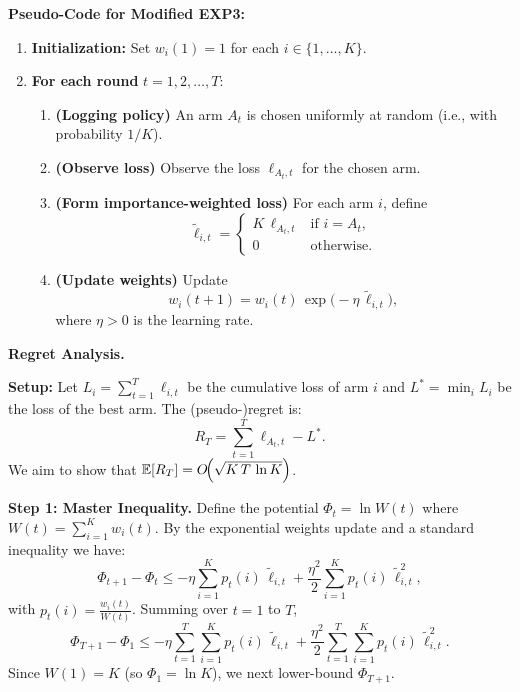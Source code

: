 \medskip
\noindent
\textbf{Pseudo-Code for Modified EXP3:}
\begin{enumerate}
    \item \textbf{Initialization:} Set \(w_i(1)=1\) for each \(i\in\{1,\dots,K\}\).
    \item \textbf{For each round} \(t=1,2,\dots,T\):
    \begin{enumerate}
       \item \textbf{(Logging policy)} An arm \(A_t\) is chosen uniformly at random (i.e., with probability \(1/K\)).
       \item \textbf{(Observe loss)} Observe the loss \(\ell_{A_t,t}\) for the chosen arm.
       \item \textbf{(Form importance-weighted loss)} For each arm \(i\), define
       \[
         \tilde{\ell}_{i,t}=
         \begin{cases}
           K\,\ell_{A_t,t} & \text{if } i=A_t,\\[1mm]
           0 & \text{otherwise.}
         \end{cases}
       \]
       \item \textbf{(Update weights)} Update
       \[
         w_i(t+1)=w_i(t)\,\exp\bigl(-\eta\,\tilde{\ell}_{i,t}\bigr),
       \]
       where \(\eta>0\) is the learning rate.
    \end{enumerate}
\end{enumerate}

\medskip
\noindent
\textbf{Regret Analysis.}

\medskip
\noindent
\textbf{Setup:}  
Let \(L_i=\sum_{t=1}^T \ell_{i,t}\) be the cumulative loss of arm \(i\) and \(L^*=\min_i L_i\) be the loss of the best arm.  
The (pseudo-)regret is:
\[
   R_T=\sum_{t=1}^T \ell_{A_t,t} - L^*.
\]
We aim to show that \(\mathbb{E}[R_T]=O\!\Bigl(\sqrt{K\,T\,\ln K}\Bigr)\).

\medskip
\noindent
\textbf{Step 1: Master Inequality.}  
Define the potential \(\Phi_t=\ln W(t)\) where \(W(t)=\sum_{i=1}^K w_i(t)\).  
By the exponential weights update and a standard inequality we have:
\[
   \Phi_{t+1}-\Phi_t\le -\eta\sum_{i=1}^K p_t(i)\,\tilde{\ell}_{i,t} + \frac{\eta^2}{2}\sum_{i=1}^K p_t(i)\,\tilde{\ell}_{i,t}^2,
\]
with \(p_t(i)=\frac{w_i(t)}{W(t)}\). Summing over \(t=1\) to \(T\),
\[
   \Phi_{T+1}-\Phi_1\le -\eta\sum_{t=1}^T\sum_{i=1}^K p_t(i)\,\tilde{\ell}_{i,t} + \frac{\eta^2}{2}\sum_{t=1}^T\sum_{i=1}^K p_t(i)\,\tilde{\ell}_{i,t}^2.
\]
Since \(W(1)=K\) (so \(\Phi_1=\ln K\)), we next lower-bound \(\Phi_{T+1}\).


